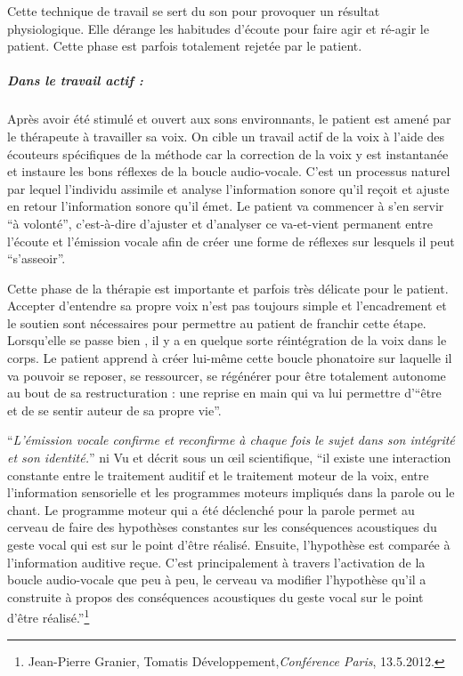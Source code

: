 Cette technique de travail se sert du son pour provoquer un résultat
physiologique. Elle dérange les habitudes d'écoute pour faire agir
et ré-agir le patient. Cette phase est parfois totalement rejetée
par le patient.

\subparagraph{Dans le travail actif :}

Après avoir été stimulé et ouvert aux sons environnants, le patient
est amené par le thérapeute à travailler sa voix. On cible un travail
actif de la voix à l'aide des écouteurs spécifiques de la méthode
car la correction de la voix y est instantanée et instaure les bons
réflexes de la boucle audio-vocale. C'est un processus naturel par
lequel l'individu assimile et analyse l'information sonore qu'il reçoit
et ajuste en retour l'information sonore qu'il émet. Le patient va
commencer à s'en servir ``à volonté'', c'est-à-dire d'ajuster et
d'analyser ce va-et-vient permanent entre l'écoute et l'émission vocale
afin de créer une forme de réflexes sur lesquels il peut ``s'asseoir''. 

Cette phase de la thérapie est importante et parfois très délicate
pour le patient. Accepter d'entendre sa propre voix n'est pas toujours
simple et l'encadrement et le soutien sont nécessaires pour permettre
au patient de franchir cette étape. Lorsqu'elle se passe bien , il
y a en quelque sorte réintégration de la voix dans le corps. Le patient
apprend à créer lui-même cette boucle phonatoire sur laquelle il va
pouvoir se reposer, se ressourcer, se régénérer pour être totalement
autonome au bout de sa restructuration : une reprise en main qui va
lui permettre d'``être et de se sentir auteur de sa propre vie''. 

\enquote{\emph{L'émission vocale confirme et reconfirme à chaque
fois le sujet dans son intégrité et son identité.}}%
\autocite[Tomatis en fait une description précise dans la troisième partie de
son livre, pp. 185--301]{tomatis:loreille}
ni
Vu et décrit sous un \oe il scientifique, \enquote{il existe une interaction
constante entre le traitement auditif et le traitement moteur de la
voix, entre l'information sensorielle et les programmes moteurs impliqués
dans la parole ou le chant. Le programme moteur qui a été déclenché
pour la parole permet au cerveau de faire des hypothèses constantes
sur les conséquences acoustiques du geste vocal qui est sur le point
d'être réalisé. Ensuite, l'hypothèse est comparée à l'information
auditive reçue. C'est principalement à travers l'activation de la
boucle audio-vocale que peu à peu, le cerveau va modifier l'hypothèse
qu'il a construite à propos des conséquences acoustiques du geste
vocal sur le point d'être réalisé.}\footnote{Jean-Pierre Granier, Tomatis Développement,\emph{Conférence Paris}, 13.5.2012.}
